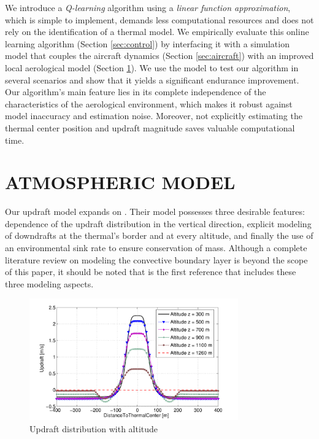 \documentclass{jfpda}
\begin{document}
We introduce a \emph{Q-learning} algorithm using a \emph{linear function approximation}, which is simple to implement, demands less computational resources and does not rely on the identification of a thermal model.
We empirically evaluate this online learning algorithm (Section \ref{sec:control}) by interfacing it with a simulation model that couples the aircraft dynamics (Section \ref{sec:aircraft}) with an improved local aerological model (Section \ref{sec:atmos}).
We use the model to test our algorithm in several scenarios and show that it yields a significant endurance improvement. Our algorithm's main feature lies in its complete independence of the characteristics of the aerological environment, which makes it robust against model inaccuracy and estimation noise. Moreover, not explicitly estimating the thermal center position and updraft magnitude saves valuable computational time.

\section{ATMOSPHERIC MODEL}
\label{sec:atmos}

Our updraft model expands on \cite{allen_thermal}. Their model possesses three desirable features: dependence of the updraft distribution in the vertical direction, explicit modeling of downdrafts at the thermal's border and at every altitude, and finally the use of an environmental sink rate to ensure conservation of mass. Although a complete literature review on modeling the convective boundary layer is beyond the scope of this paper, it should be noted that \cite{allen_thermal} is the first reference that includes these three modeling aspects.


\begin{figure}%
\begin{center}
 \includegraphics[width=9cm]{img/total_updraft.pdf}
\end{center}
 \caption{Updraft distribution with altitude}
 \label{fig:updraft_distribution}
\end{figure}
\end{document}
